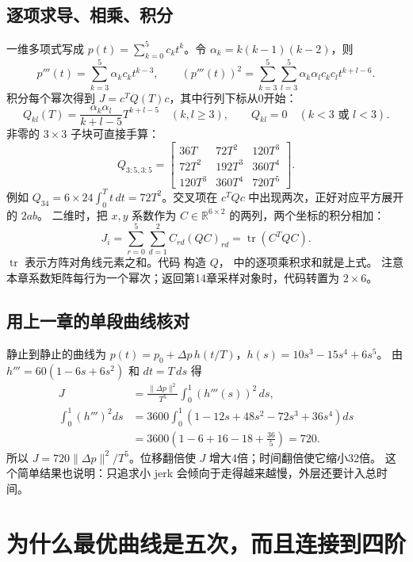 \subsection{逐项求导、相乘、积分}
一维多项式写成 $p(t)=\sum_{k=0}^5c_kt^k$。令 $\alpha_k=k(k-1)(k-2)$，则
\[
 p'''(t)=\sum_{k=3}^5\alpha_kc_kt^{k-3},\qquad
 (p'''(t))^2=\sum_{k=3}^5\sum_{l=3}^5\alpha_k\alpha_lc_kc_lt^{k+l-6}.
\]
积分每个幂次得到 $J=c^TQ(T)c$，其中行列下标从0开始：
\begin{equation}
 Q_{kl}(T)=\frac{\alpha_k\alpha_l}{k+l-5}T^{k+l-5}\quad(k,l\ge3),
 \qquad Q_{kl}=0\quad(k<3\text{ 或 }l<3).
\end{equation}
非零的 $3\times3$ 子块可直接手算：
\[
 Q_{3:5,3:5}=\begin{bmatrix}
 36T&72T^2&120T^3\\72T^2&192T^3&360T^4\\120T^3&360T^4&720T^5
 \end{bmatrix}.
\]
例如 $Q_{34}=6\times24\int_0^Tt\,dt=72T^2$。交叉项在 $c^TQc$ 中出现两次，正好对应平方展开的 $2ab$。
二维时，把 $x,y$ 系数作为 $C\in\mathbb R^{6\times2}$ 的两列，两个坐标的积分相加：
\[
 J_i=\sum_{r=0}^5\sum_{d=1}^2 C_{rd}(QC)_{rd}
     =\operatorname{tr}(C^TQC).
\]
$\operatorname{tr}$ 表示方阵对角线元素之和。代码  构造 $Q$，
 中的逐项乘积求和就是上式。
注意本章系数矩阵每行为一个幂次；返回第14章采样对象时，代码转置为 $2\times6$。

\subsection{用上一章的单段曲线核对}
静止到静止的曲线为 $p(t)=p_0+\Delta p\,h(t/T)$，$h(s)=10s^3-15s^4+6s^5$。
由 $h'''=60(1-6s+6s^2)$ 和 $dt=T\,ds$ 得
\begin{align}
 J&=\frac{\|\Delta p\|^2}{T^5}\int_0^1(h'''(s))^2\,ds,\\
 \int_0^1(h''')^2ds
 &=3600\int_0^1(1-12s+48s^2-72s^3+36s^4)ds\\
 &=3600\left(1-6+16-18+\frac{36}{5}\right)=720.
\end{align}
所以 $J=720\|\Delta p\|^2/T^5$。位移翻倍使 $J$ 增大4倍；时间翻倍使它缩小32倍。
这个简单结果也说明：只追求小 jerk 会倾向于走得越来越慢，外层还要计入总时间。

\clearpage
\section{为什么最优曲线是五次，而且连接到四阶}
